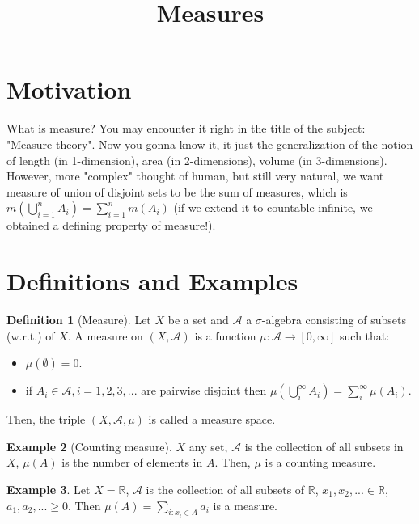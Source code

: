 \documentclass[11pt,a4paper]{article}
\title{\textbf{Measures}}
\theoremstyle{definition}
\newtheorem{definition}{Definition}[section]
\newtheorem{example}[definition]{Example}
\theoremstyle{plain}
\newcommand{\R}{\mathbb{R}}
\newcommand{\A}{\mathcal{A}}
\begin{document}
\maketitle
\tableofcontents
\newpage

\section{Motivation}

\begin{mynote}
What is measure? You may encounter it right in the title of the subject: "Measure theory". Now you gonna know it, it just the generalization of the notion of length (in 1-dimension), area (in 2-dimensions), volume (in 3-dimensions). However, more "complex" thought of human, but still very natural, we want measure of union of disjoint sets to be the sum of measures, which is $m(\bigcup_{i=1}^nA_i) = \sum_{i=1}^nm(A_i)$ (if we extend it to countable infinite, we obtained a defining property of measure!).
\end{mynote}


\section{Definitions and Examples}


\begin{definition}[Measure]
Let $X$ be a set and $\A$ a $\sigma$-algebra consisting of subsets (w.r.t.) of $X$. A measure on $(X, \A)$ is a function $\mu: \A \rightarrow [0, \infty]$ such that:
\begin{itemize}
    \item $\mu(\emptyset)= 0$.
    \item if $A_i \in \A, i=1,2,3,...$ are pairwise disjoint then $\mu(\bigcup_i^{\infty}A_i)=\sum_i^{\infty}\mu(A_i)$.
\end{itemize}

Then, the triple $(X, \A, \mu)$ is called a measure space.
\end{definition}

\begin{example}[Counting measure]
$X$ any set, $\A$ is the collection of all subsets in $X$, $\mu(A)$ is the number of elements in $A$. Then, $\mu$ is a counting measure.
\end{example}

\begin{example}
Let $X = \R$, $\A$ is the collection of all subsets of $\R$, $x_1, x_2,... \in \R$, $a_1, a_2,... \ge 0$. Then $\mu(A) = \sum_{i:x_i\in A}a_i$ is a measure.
\end{example}
\end{document}
